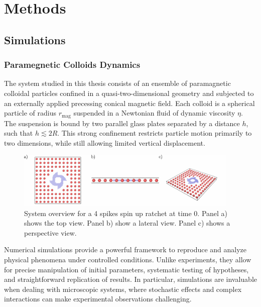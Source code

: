 \part{Methods}
\label{part:methods}

\chapter{Simulations}

\section{Paramegnetic Colloids Dynamics}

The system studied in this thesis consists of an ensemble of paramagnetic colloidal particles confined in a quasi-two-dimensional geometry and subjected to an externally applied precessing conical magnetic field. Each colloid is a spherical particle of radius $r_{\mathrm{mag}}$ suspended in a Newtonian fluid of dynamic viscosity $\eta$. The suspension is bound by two parallel glass plates separated by a distance $h$, such that $h \lesssim 2R$. This strong confinement restricts particle motion primarily to two dimensions, while still allowing limited vertical displacement. 

\begin{figure}
  \begin{center}
    \includegraphics[width=0.95\textwidth]{figures/system.pdf}
  \end{center}
  \caption[System overview.]{System overview for a 4 spikes spin up ratchet at time 0. Panel a) shows the top view. Panel b) show a lateral view. Panel c) shows a perspective view.}\label{fig:system}
\end{figure}



Numerical simulations provide a powerful framework to reproduce and analyze physical phenomena under controlled conditions. Unlike experiments, they allow for precise manipulation of initial parameters, systematic testing of hypotheses, and straightforward replication of results. In particular, simulations are invaluable when dealing with microscopic systems, where stochastic effects and complex interactions can make experimental observations challenging. 

